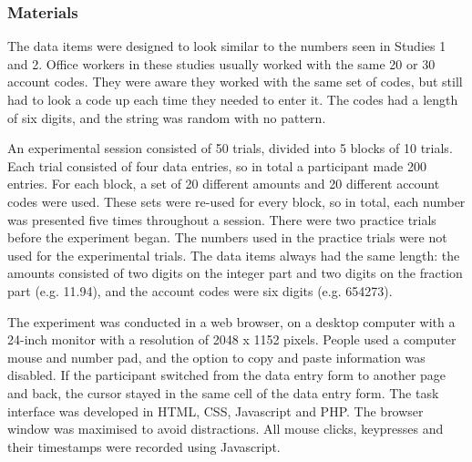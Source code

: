 

\subsubsection{Materials}
The data items were designed to look similar to the numbers seen in Studies 1 and 2. Office workers in these studies usually worked with the same 20 or 30 account codes. They were aware they worked with the same set of codes, but still had to look a code up each time they needed to enter it. The codes had a length of six digits, and the string was random with no pattern. 

An experimental session consisted of 50 trials, divided into 5 blocks of 10 trials.  Each trial consisted of four data entries, so in total a participant made 200 entries. For each block, a set of 20 different amounts and 20 different account codes were used. These sets were re-used for every block, so in total, each number was presented five times throughout a session. There were two practice trials before the experiment began. The numbers used in the practice trials were not used for the experimental trials. The data items always had the same length: the amounts consisted of two digits on the integer part and two digits on the fraction part (e.g. 11.94), and the account codes were six digits (e.g. 654273).

The experiment was conducted in a web browser, on a desktop computer with a 24-inch monitor with a resolution of 2048 x 1152 pixels. People used a computer mouse and number pad, and the option to copy and paste information was disabled. If the participant switched from the data entry form to another page and back, the cursor stayed in the same cell of the data entry form. The task interface was developed in HTML, CSS, Javascript and PHP. The browser window was maximised to avoid distractions. All mouse clicks, keypresses and their timestamps were recorded using Javascript. 

